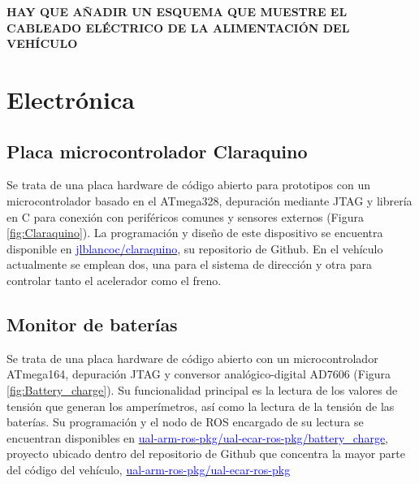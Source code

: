 \textbf{HAY QUE AÑADIR UN ESQUEMA QUE MUESTRE EL CABLEADO ELÉCTRICO DE LA ALIMENTACIÓN DEL VEHÍCULO}

\section{Electrónica}
\subsection{Placa microcontrolador Claraquino}\label{Subsec:Claraquino}
Se trata de una placa hardware de código abierto para prototipos con un microcontrolador basado en el ATmega328, depuración mediante JTAG y librería en C para conexión con periféricos comunes y sensores externos (Figura \ref{fig:Claraquino}). La programación y diseño de este dispositivo se encuentra disponible en \href{https://github.com/jlblancoc/claraquino}{\textcolor{blue}{jlblancoc/claraquino}}, su repositorio de Github. En el vehículo actualmente se emplean dos, una para el sistema de dirección y otra para controlar tanto el acelerador como el freno.

\subsection{Monitor de baterías}\label{Subsec:Monitor_Bateria}
Se trata de una placa hardware de código abierto con un microcontrolador ATmega164, depuración JTAG y conversor analógico-digital AD7606 (Figura \ref{fig:Battery_charge}). Su funcionalidad principal es la lectura de los valores de tensión que generan los amperímetros, así como la lectura de la tensión de las baterías. Su programación y el nodo de ROS encargado de su lectura se encuentran disponibles en \href{https://github.com/ual-arm-ros-pkg/ual-ecar-ros-pkg/tree/master/battery_charge}{\textcolor{blue}{ual-arm-ros-pkg/ual-ecar-ros-pkg/battery\_charge}}, proyecto ubicado dentro del repositorio de Github que concentra la mayor parte del código del vehículo, \href{https://github.com/ual-arm-ros-pkg/ual-ecar-ros-pkg}{\textcolor{blue}{ual-arm-ros-pkg/ual-ecar-ros-pkg}}

